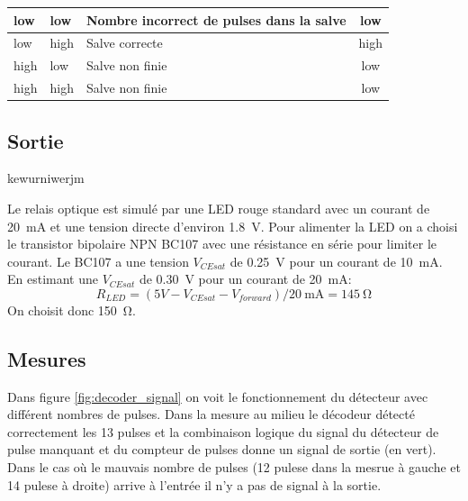 \documentclass[french]{layout/Report}
\begin{document}
\begin{center}
    \begin{tabular}{| m{4cm} | m{4cm} | l | c |}
        \hline
        low     & low       & Nombre incorrect de pulses dans la salve & low \\ \hline
        low     & high  & Salve correcte    & high\\ \hline
        high    & low       & Salve non finie & low \\ \hline
        high    & high  & Salve non finie & low \\ \hline
    \end{tabular}
\end{center}

\subsection{Sortie}


\begin{description}[leftmargin=!,labelwidth=4cm, labelindent=\parindent]
	\item[Déclencheur] kewurniwerjm
	\item[Relais] Le relais optique est simulé par une LED rouge standard avec un courant de \SI{20}{\milli\ampere} et une tension directe d'environ \SI{1.8}{\volt}. Pour alimenter la LED on a choisi le transistor bipolaire NPN BC107 avec une résistance en série pour limiter le courant.
		Le BC107 a une tension \(V_{CEsat}\) de \SI{0.25}{\volt} pour un courant de \SI{10}{\milli\ampere}.
		En estimant une \(V_{CEsat}\) de \SI{0.30}{\volt} pour un courant de \SI{20}{\milli\ampere}:
\[
	R_{LED} = (5V - V_{CEsat} - V_{forward})/\SI{20}{\milli\ampere} = \SI{145}{\ohm}
\]
On choisit donc \SI{150}{\ohm}.


\end{description}
\subsection{Mesures}

Dans figure \ref{fig:decoder_signal} on voit le fonctionnement du détecteur avec différent nombres de pulses.
Dans la mesure au milieu le décodeur détecté correctement les 13 pulses et la combinaison logique
du signal du détecteur de pulse manquant et du compteur de pulses donne un signal de sortie (en vert).
Dans le cas où le mauvais nombre  de pulses (12 pulese dans la mesrue à gauche et 14 pulese à droite)
arrive à l'entrée il n'y a pas de signal à la sortie.
\end{document}
